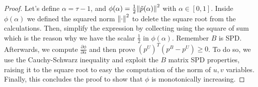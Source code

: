 \documentclass[unicode,11pt,a4paper,oneside,numbers=endperiod,openany]{scrartcl}
\begin{document}
\begin{proof}{}
    Let's define $\alpha = \tau - 1$,
    and $\phi(\alpha) = \frac{1}{2} \norm{\tilde{p}(\alpha)}^2$ with $\alpha \in [0, 1]$.
    Inside $\phi(\alpha)$ we defined the squared norm $\norm{\cdot}^2$
    to delete the square root from the calculations.
    Then, simplify the expression by collecting using the square of sum which is the reason
    why we have the scalar $\frac{1}{2}$ in $\phi(\alpha)$.
    Remember $B$ is SPD.
    Afterwards, we compute $\frac{\partial \phi}{\partial \alpha}$
    and then prove $\left( p^U \right)^T \left( p^B - p^U \right) \geq 0$.
    To do so, we use the Cauchy-Schwarz inequality and exploit the $B$ matrix SPD properties,
    raising it to the square root to easy the computation of the norm of $u, v$ variables.
    Finally, this concludes the proof to show that $\phi$ is monotonically increasing.



\end{proof}
\end{document}

